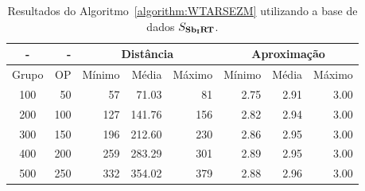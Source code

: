 \begin{table}[!htb]
  \caption{Resultados do Algoritmo~\ref{algorithm:WTARSEZM} utilizando a base de dados $S_{\textbf{Sb\textsubscript{I}RT}}{}$.}
  \label{table:UFTEBCWC}
  \centering
  \begin{tabular}{|c|r|r|r|r|r|r|r|}
    \hline
      -      &  -   & \multicolumn{3}{c|}{Distância}             & \multicolumn{3}{c|}{Aproximação}           \\ \hline
    Grupo    & OP   & Mínimo       & Média        & Máximo       & Mínimo       & Média        & Máximo       \\ \hline  
    100      & 50   & 57           & 71.03        & 81           & 2.75         & 2.91         & 3.00         \\ \hline
    200      & 100  & 127          & 141.76       & 156          & 2.82         & 2.94         & 3.00         \\ \hline
    300      & 150  & 196          & 212.60       & 230          & 2.86         & 2.95         & 3.00         \\ \hline
    400      & 200  & 259          & 283.29       & 301          & 2.89         & 2.95         & 3.00         \\ \hline
    500      & 250  & 332          & 354.02       & 379          & 2.88         & 2.96         & 3.00         \\ \hline    
  \end{tabular}
\end{table}